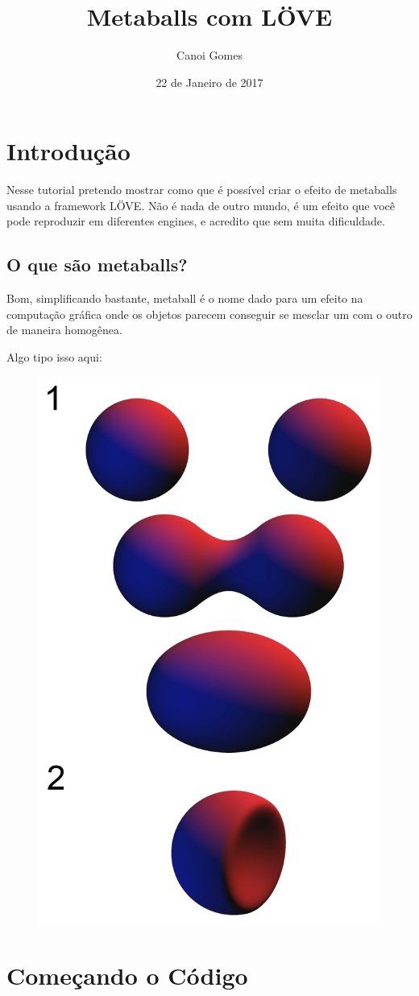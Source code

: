 \documentclass[a4paper,oneside,12pt]{article}
\title{Metaballs com LÖVE}
\author{Canoi Gomes}
\date{22 de Janeiro de 2017}
\begin{document}
\maketitle
\newpage

\tableofcontents
\newpage

\section{Introdução}

Nesse tutorial pretendo mostrar como que é possível criar o efeito de metaballs usando a framework LÖVE. Não é nada de outro mundo, é um efeito que você pode reproduzir em diferentes engines, e acredito que sem muita dificuldade.

\subsection{O que são metaballs?}

Bom, simplificando bastante, metaball é o nome dado para um efeito na computação gráfica onde os objetos parecem conseguir se mesclar um com o outro de maneira homogênea.

Algo tipo isso aqui:

\begin{figure}[h]
    \centering
    \includegraphics[width=0.5\linewidth]{media/metaballs.png}
\end{figure}
\break

\section{Começando o Código}
\end{document}
